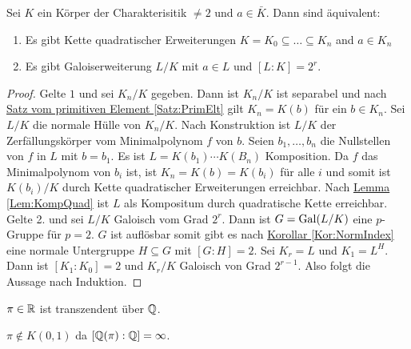 \begin{Satz}
    Sei $K$ ein Körper der Charakterisitik $\neq 2$ und $a\in\bar K$. Dann sind äquivalent:
    \begin{enumerate}
        \item Es gibt Kette quadratischer Erweiterungen $K=K_0\subseteq \dots\subseteq K_n$ and $a\in K_n$
        \item Es gibt Galoiserweiterung $L/K$ mit $a\in L$ und $[L:K]=2^r$.
    \end{enumerate}
\end{Satz}
\begin{proof}
    Gelte $1$ und sei $K_n/K$ gegeben. Dann ist $K_n/K$ ist separabel und nach \hyperref[Satz:PrimElt]{Satz vom primitiven Element \ref{Satz:PrimElt}} gilt $K_n=K(b)$ für ein $b\in K_n$. Sei $L/K$ die normale Hülle von $K_n/K$. Nach Konstruktion ist $L/K$ der Zerfällungskörper vom Minimalpolynom $f$ von $b$. Seien $b_1,\dots,b_n$ die Nullstellen von $f$ in $L$ mit $b=b_1.$ Es ist $L=K(b_1)\cdots K(B_n)$ Komposition. Da $f$ das Minimalpolynom von $b_i$ ist, ist $K_n=K(b)=K(b_i)$ für alle $i$ und somit ist $K(b_i)/K$ durch Kette quadratischer Erweiterungen erreichbar. Nach \hyperref[Lem:KompQuad]{Lemma \ref{Lem:KompQuad}} ist $L$ als Kompositum durch quadratische Kette erreichbar. Gelte 2. und sei $L/K$ Galoisch vom Grad $2^r$. Dann ist $G=\operatorname{Gal}(L/K)$ eine $p$-Gruppe für $p=2$.
    $G$ ist auflösbar somit gibt es nach \hyperref[Kor:NormIndex]{Korollar \ref{Kor:NormIndex}} eine normale Untergruppe $H\subseteq G$ mit $[G:H]=2$.
    Sei $K_r=L$ und $K_1=L^H$. Dann ist $[K_1:K_0]=2$ und $K_r/K$ Galoisch von Grad $2^{r-1}$. Also folgt die Aussage nach Induktion.
\end{proof}
\begin{Satz}
    $\pi\in\mathbb{R}$ ist transzendent über $\mathbb{Q}$.
\end{Satz}
\begin{Kor}
    $\pi\not\in K(0,1)$ da $[\mathbb{Q}(\pi):\mathbb{Q}]=\infty$.
\end{Kor}
